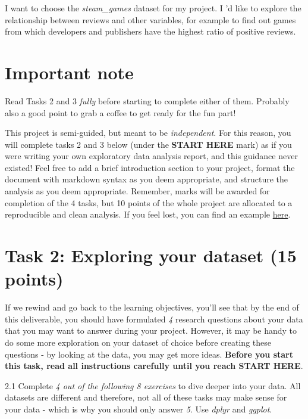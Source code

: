 \documentclass[
]{article}
\begin{document}
I want to choose the \emph{steam\_games} dataset for my project. I 'd
like to explore the relationship between reviews and other variables,
for example to find out games from which developers and publishers have
the highest ratio of positive reviews.

\hypertarget{important-note}{%
\section{Important note}\label{important-note}}

Read Tasks 2 and 3 \emph{fully} before starting to complete either of
them. Probably also a good point to grab a coffee to get ready for the
fun part!

This project is semi-guided, but meant to be \emph{independent}. For
this reason, you will complete tasks 2 and 3 below (under the
\textbf{START HERE} mark) as if you were writing your own exploratory
data analysis report, and this guidance never existed! Feel free to add
a brief introduction section to your project, format the document with
markdown syntax as you deem appropriate, and structure the analysis as
you deem appropriate. Remember, marks will be awarded for completion of
the 4 tasks, but 10 points of the whole project are allocated to a
reproducible and clean analysis. If you feel lost, you can find an
example \href{link\%20example}{here}.

\hypertarget{task-2-exploring-your-dataset-15-points}{%
\section{Task 2: Exploring your dataset (15
points)}\label{task-2-exploring-your-dataset-15-points}}

If we rewind and go back to the learning objectives, you'll see that by
the end of this deliverable, you should have formulated \emph{4}
research questions about your data that you may want to answer during
your project. However, it may be handy to do some more exploration on
your dataset of choice before creating these questions - by looking at
the data, you may get more ideas. \textbf{Before you start this task,
read all instructions carefully until you reach START HERE}.

2.1 Complete \emph{4 out of the following 8 exercises} to dive deeper
into your data. All datasets are different and therefore, not all of
these tasks may make sense for your data - which is why you should only
answer \emph{5}. Use \emph{dplyr} and \emph{ggplot}.
\end{document}
